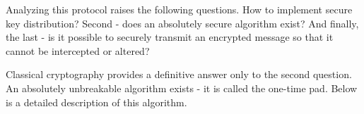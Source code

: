 Analyzing this protocol raises the following questions. How
to implement secure key distribution? Second - does an
absolutely secure algorithm exist? And finally, the last - is it
possible to securely transmit an encrypted message so that it cannot be
intercepted or altered? 

Classical cryptography provides a definitive answer only to the second
question. An absolutely unbreakable algorithm exists - it is called the
one-time pad. Below is a detailed description of this algorithm.